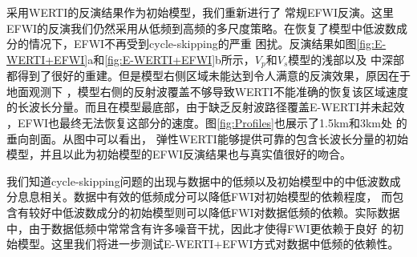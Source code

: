 采用WERTI的反演结果作为初始模型，我们重新进行了
常规EFWI反演。这里EFWI的反演我们仍然采用从低频到高频的多尺度策略。在恢复了模型中低波数成分的情况下，EFWI不再受到cycle-skipping的严重
困扰。反演结果如图\ref{fig:E-WERTI+EFWI}a和\ref{fig:E-WERTI+EFWI}b所示，$V_p$和$V_s$模型的浅部以及
中深部都得到了很好的重建。但是模型右侧区域未能达到令人满意的反演效果，原因在于地面观测下
，模型右侧的反射波覆盖不够导致WERTI不能准确的恢复该区域速度的长波长分量。而且在模型最底部，由于缺乏反射波路径覆盖E-WERTI并未起效
，EFWI也最终无法恢复这部分的速度。图\ref{fig:Profiles}也展示了1.5km和3km处
的垂向剖面。从图中可以看出，
弹性WERTI能够提供可靠的包含长波长分量的初始模型，并且以此为初始模型的EFWI反演结果也与真实值很好的吻合。

我们知道cycle-skipping问题的出现与数据中的低频以及初始模型中的中低波数成分息息相关。数据中有效的低频成分可以降低FWI对初始模型的依赖程度，
而包含有较好中低波数成分的初始模型则可以降低FWI对数据低频的依赖。实际数据中，由于数据低频中常常含有许多噪音干扰，因此才使得FWI更依赖于良好
的初始模型。这里我们将进一步测试E-WERTI+EFWI方式对数据中低频的依赖性。

